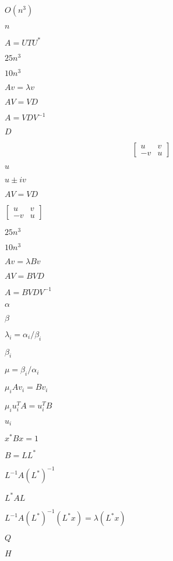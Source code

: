 \documentclass{article}
\begin{document}
$ O(n^3) $
\pagebreak

$ n $
\pagebreak

$ A = U T U^*$
\pagebreak

$25n^3$
\pagebreak

$10n^3$
\pagebreak

$ Av = \lambda v $
\pagebreak

$ A V =
V D $
\pagebreak

$ A = V D V^{-1} $
\pagebreak

$ D
$
\pagebreak

\[ \begin{bmatrix} u & v \\ -v & u \end{bmatrix} \]
\pagebreak

$ u $
\pagebreak

$ u \pm iv $
\pagebreak

$ AV = VD $
\pagebreak

$ \begin{bmatrix} u & v \\ -v & u \end{bmatrix} $
\pagebreak

$ 25n^3 $
\pagebreak

$ 10n^3 $
\pagebreak

$ Av = \lambda Bv $
\pagebreak

$ A V =
B V D $
\pagebreak

$ A = B V D V^{-1} $
\pagebreak

$ \alpha $
\pagebreak

$ \beta $
\pagebreak

$ \lambda_i = \alpha_i / \beta_i $
\pagebreak

$ \beta_i $
\pagebreak

$ \mu = \beta_i / \alpha_i$
\pagebreak

$ \mu_i A v_i = B v_i $
\pagebreak

$ \mu_i u_i^T A  = u_i^T B $
\pagebreak

$ u_i $
\pagebreak

$ x^* B x = 1 $
\pagebreak

$ B = LL^* $
\pagebreak

$ L^{-1} A (L^*)^{-1} $
\pagebreak

$ L^{*} A L $
\pagebreak

$ L^{-1} A (L^*)^{-1} (L^* x) = \lambda (L^* x) $
\pagebreak

$ Q $
\pagebreak

$ H $
\pagebreak
\end{document}
